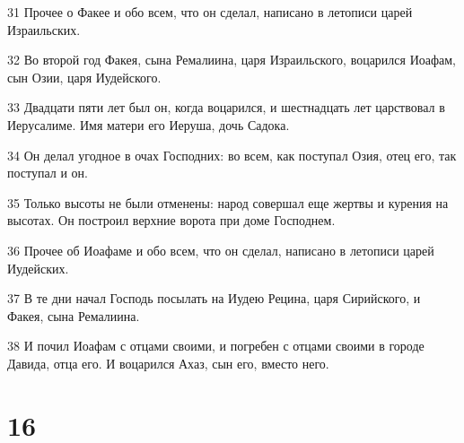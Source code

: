 \par 31 Прочее о Факее и обо всем, что он сделал, написано в летописи царей Израильских.
\par 32 Во второй год Факея, сына Ремалиина, царя Израильского, воцарился Иоафам, сын Озии, царя Иудейского.
\par 33 Двадцати пяти лет был он, когда воцарился, и шестнадцать лет царствовал в Иерусалиме. Имя матери его Иеруша, дочь Садока.
\par 34 Он делал угодное в очах Господних: во всем, как поступал Озия, отец его, так поступал и он.
\par 35 Только высоты не были отменены: народ совершал еще жертвы и курения на высотах. Он построил верхние ворота при доме Господнем.
\par 36 Прочее об Иоафаме и обо всем, что он сделал, написано в летописи царей Иудейских.
\par 37 В те дни начал Господь посылать на Иудею Рецина, царя Сирийского, и Факея, сына Ремалиина.
\par 38 И почил Иоафам с отцами своими, и погребен с отцами своими в городе Давида, отца его. И воцарился Ахаз, сын его, вместо него.

\chapter{16}

